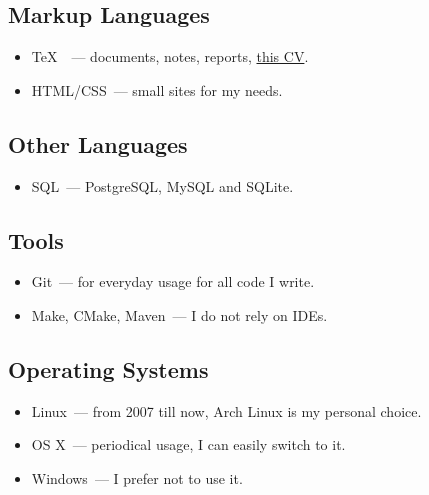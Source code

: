     \subsection*{Markup Languages}

      \begin{itemize}

        \item \TeX\ ~--- documents, notes, reports, \href{https://github.com/ming13/cv/}{this CV}.

        \item HTML/CSS~--- small sites for my needs.

      \end{itemize}

    \subsection*{Other Languages}

      \begin{itemize}

        \item SQL~--- PostgreSQL, MySQL and SQLite.

      \end{itemize}

    \subsection*{Tools}

      \begin{itemize}

        \item Git~--- for everyday usage for all code I write.

        \item Make, CMake, Maven~--- I do not rely on IDEs.

      \end{itemize}

    \subsection*{Operating Systems}

      \begin{itemize}

        \item Linux~--- from 2007 till now, Arch Linux is my personal choice.

        \item OS X~--- periodical usage, I can easily switch to it.

        \item Windows~--- I prefer not to use it.

      \end{itemize}


